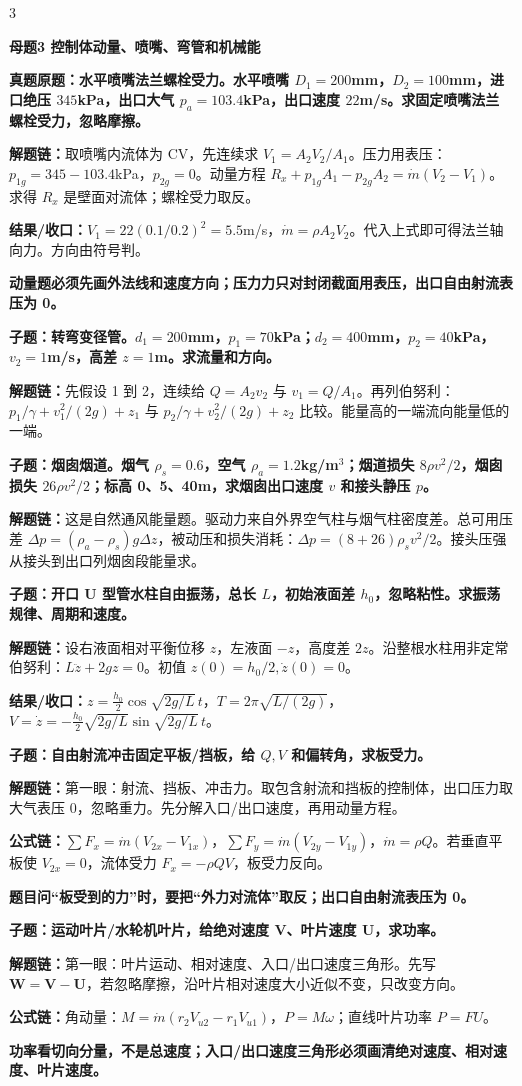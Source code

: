 \documentclass[a4paper]{article}
\newcommand{\mt}[1]{\vspace{0.22pt}\colorbox{M}{\parbox{\dimexpr\linewidth-2\fboxsep}{\color{white}\bfseries #1}}\par}
\newcommand{\qt}[1]{\vspace{0.10pt}\colorbox{Q}{\parbox{\dimexpr\linewidth-2\fboxsep}{\color{white}\bfseries #1}}\par}
\newcommand{\warn}[1]{\colorbox{Y}{\parbox{\dimexpr\linewidth-2\fboxsep}{\color{E}\bfseries #1}}\par}
\newcommand{\chain}[1]{{\color{A}\bfseries 解题链：}#1\par}
\newcommand{\res}[1]{{\color{E}\bfseries 结果/收口：}#1\par}
\newcommand{\form}[1]{{\color{M}\bfseries 公式链：}#1\par}
\begin{document}
\begin{multicols}{3}
\mt{母题3 控制体动量、喷嘴、弯管和机械能}
\qt{真题原题：水平喷嘴法兰螺栓受力。水平喷嘴 $D_1=200$mm，$D_2=100$mm，进口绝压 $345$kPa，出口大气 $p_a=103.4$kPa，出口速度 $22$m/s。求固定喷嘴法兰螺栓受力，忽略摩擦。}
\chain{取喷嘴内流体为 CV，先连续求 $V_1=A_2V_2/A_1$。压力用表压：$p_{1g}=345-103.4$kPa，$p_{2g}=0$。动量方程 $R_x+p_{1g}A_1-p_{2g}A_2=\dot m(V_2-V_1)$。求得 $R_x$ 是壁面对流体；螺栓受力取反。}
\res{$V_1=22(0.1/0.2)^2=5.5$m/s，$\dot m=\rho A_2V_2$。代入上式即可得法兰轴向力。方向由符号判。}
\warn{动量题必须先画外法线和速度方向；压力力只对封闭截面用表压，出口自由射流表压为 0。}

\qt{子题：转弯变径管。$d_1=200$mm，$p_1=70$kPa；$d_2=400$mm，$p_2=40$kPa，$v_2=1$m/s，高差 $z=1$m。求流量和方向。}
\chain{先假设 1 到 2，连续给 $Q=A_2v_2$ 与 $v_1=Q/A_1$。再列伯努利：$p_1/\gamma+v_1^2/(2g)+z_1$ 与 $p_2/\gamma+v_2^2/(2g)+z_2$ 比较。能量高的一端流向能量低的一端。}

\qt{子题：烟囱烟道。烟气 $\rho_s=0.6$，空气 $\rho_a=1.2$kg/m$^3$；烟道损失 $8\rho v^2/2$，烟囱损失 $26\rho v^2/2$；标高 0、5、40m，求烟囱出口速度 $v$ 和接头静压 $p$。}
\chain{这是自然通风能量题。驱动力来自外界空气柱与烟气柱密度差。总可用压差 $\Delta p=(\rho_a-\rho_s)g\Delta z$，被动压和损失消耗：$\Delta p=(8+26)\rho_s v^2/2$。接头压强从接头到出口列烟囱段能量求。}

\qt{子题：开口 U 型管水柱自由振荡，总长 $L$，初始液面差 $h_0$，忽略粘性。求振荡规律、周期和速度。}
\chain{设右液面相对平衡位移 $z$，左液面 $-z$，高度差 $2z$。沿整根水柱用非定常伯努利：$L\ddot z+2gz=0$。初值 $z(0)=h_0/2,\dot z(0)=0$。}
\res{$z=\frac{h_0}{2}\cos\sqrt{2g/L}\,t$，$T=2\pi\sqrt{L/(2g)}$，$V=\dot z=-\frac{h_0}{2}\sqrt{2g/L}\sin\sqrt{2g/L}\,t$。}

\qt{子题：自由射流冲击固定平板/挡板，给 $Q,V$ 和偏转角，求板受力。}
\chain{第一眼：射流、挡板、冲击力。取包含射流和挡板的控制体，出口压力取大气表压 0，忽略重力。先分解入口/出口速度，再用动量方程。}
\form{$\sum F_x=\dot m(V_{2x}-V_{1x})$，$\sum F_y=\dot m(V_{2y}-V_{1y})$，$\dot m=\rho Q$。若垂直平板使 $V_{2x}=0$，流体受力 $F_x=-\rho QV$，板受力反向。}
\warn{题目问“板受到的力”时，要把“外力对流体”取反；出口自由射流表压为 0。}

\qt{子题：运动叶片/水轮机叶片，给绝对速度 $\bm V$、叶片速度 $\bm U$，求功率。}
\chain{第一眼：叶片运动、相对速度、入口/出口速度三角形。先写 $\bm W=\bm V-\bm U$，若忽略摩擦，沿叶片相对速度大小近似不变，只改变方向。}
\form{角动量：$M=\dot m(r_2V_{u2}-r_1V_{u1})$，$P=M\omega$；直线叶片功率 $P=FU$。}
\warn{功率看切向分量，不是总速度；入口/出口速度三角形必须画清绝对速度、相对速度、叶片速度。}


\end{multicols}
\end{document}
